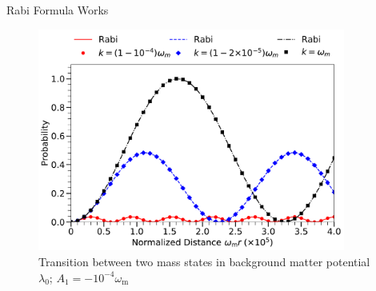 \begin{frame}{Rabi Formula Works}



\begin{tcolorbox}[colback=white]
\begin{figure}
\includegraphics[width=0.9\textwidth]{assets/rabiOscillationsNeutrinoCoincidence-single-frequency-with-legend}
\caption*{
\color{black}Transition between two mass states in background matter potential $\lambda_0$; $A_1 = -10^{-4}\omega_{\mathrm m}$
}
\end{figure}
\end{tcolorbox}

\end{frame}





